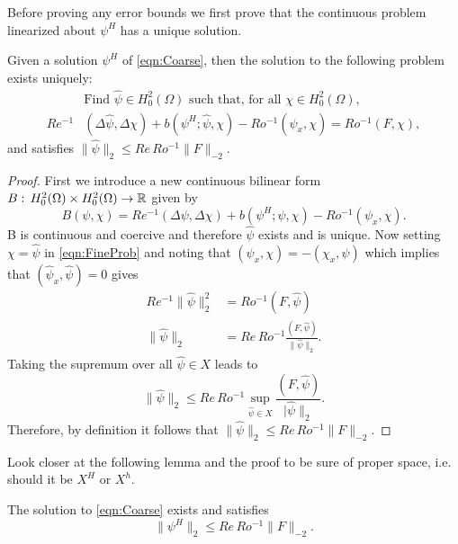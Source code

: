 Before proving any error bounds we first prove that the continuous problem
linearized about $\psi^H$ has a unique solution.
\begin{lemma}\label{lma:Fine}
  Given a solution $\psi^H$ of \eqref{eqn:Coarse}, then the solution to the
  following problem exists uniquely:
    \begin{equation}
      \begin{split}
        &\text{Find } \hat{\psi} \in H^2_0(\Omega) \text{ such that, for all }
          \chi\in H^2_0(\Omega), \\
        Re^{-1}&(\Delta \hat{\psi}, \Delta \chi)
          + b(\psi^H; \hat{\psi}, \chi)
          - Ro^{-1} (\hat{\psi}_x,\chi)
          = Ro^{-1} (F,\chi),
      \end{split}
      \label{eqn:FineProb}
    \end{equation}
    and satisfies $\|\hat{\psi}\|_2 \le Re\, Ro^{-1} \|F\|_{-2}$.
\end{lemma}
\begin{proof}
  First we introduce a new continuous bilinear form $B:\, H^2_0(\Omega) \times
  H^2_0(\Omega) \to \mathbb{R}$ given by
  \begin{equation*}
    B(\psi,\chi) = Re^{-1} (\Delta \psi, \Delta \chi)
      + b(\psi^H;\psi,\chi)
      - Ro^{-1} (\psi_x,\chi).
  \end{equation*}
  B is continuous and coercive and therefore $\hat{\psi}$ exists and is unique.
  Now setting $\chi=\hat{\psi}$ in \eqref{eqn:FineProb} and noting that
  $(\psi_x,\chi) = -(\chi_x,\psi)$ which implies that
  $(\hat{\psi}_x,\hat{\psi}) = 0$ gives
  \begin{align*}
    Re^{-1} \|\hat{\psi}\|_2^2 &= Ro^{-1} (F,\hat{\psi}) \\
    \|\hat{\psi}\|_2 &= Re\, Ro^{-1} \frac{(F,\hat{\psi})}{\|\hat{\psi}\|_2}.
  \end{align*}
  Taking the supremum over all $\hat{\psi}\in X$ leads to
  \begin{equation*}
    \|\hat{\psi}\|_{2} \le Re\, Ro^{-1} \sup_{\hat{\psi}\in X} \frac{(F,
      \hat{\psi})}{|\hat{\psi}\|_2}.
  \end{equation*}
  Therefore, by definition it follows that $\|\hat{\psi}\|_2 \le Re\, Ro^{-1} \|F\|_{-2}$.
\end{proof}
{\color{red} \LARGE Look closer at the following lemma and the proof to be sure
of proper space, i.e. should it be $X^H$ or $X^h$.}
\begin{lemma} \label{lma:Fineh}
  The solution to \eqref{eqn:Coarse} exists and satisfies
  \begin{equation*}
    \|\psi^H\|_2 \le Re\, Ro^{-1} \|F\|_{-2}.
  \end{equation*}
\end{lemma}
